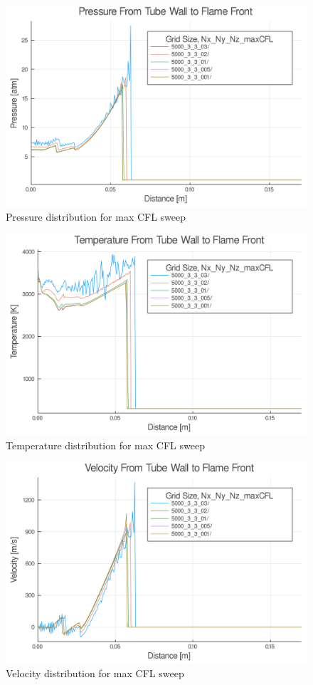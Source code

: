 \begin{figure}
    \centering
    \includegraphics[width=0.85\linewidth]{figs/cfl_test/p.png}
    \caption{Pressure distribution for max CFL sweep}
    \label{fig:cflp}
\end{figure}

\begin{figure}
    \centering
    \includegraphics[width=0.85\linewidth]{figs/cfl_test/t.png}
    \caption{Temperature distribution for max CFL sweep}
    \label{fig:cflt}
\end{figure}

\begin{figure}
    \centering
    \includegraphics[width=0.85\linewidth]{figs/cfl_test/u.png}
    \caption{Velocity distribution for max CFL sweep}
    \label{fig:cflu}
\end{figure}

